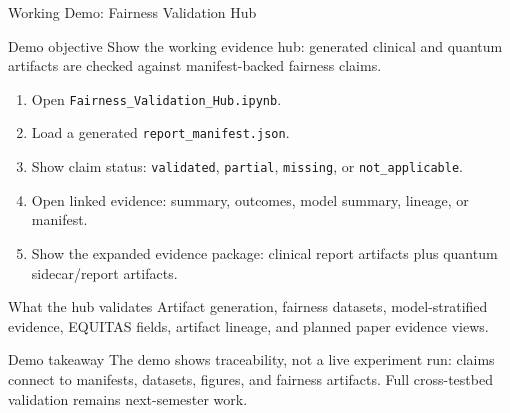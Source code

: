 \begin{frame}{Working Demo: Fairness Validation Hub}
\small

\begin{block}{Demo objective}
Show the working evidence hub: generated clinical and quantum artifacts are checked against manifest-backed fairness claims.
\end{block}

\vspace{0.2em}

\begin{enumerate}
    \item Open \texttt{Fairness\_Validation\_Hub.ipynb}.
    \item Load a generated \texttt{report\_manifest.json}.
    \item Show claim status: \texttt{validated}, \texttt{partial}, \texttt{missing}, or \texttt{not\_applicable}.
    \item Open linked evidence: summary, outcomes, model summary, lineage, or manifest.
    \item Show the expanded evidence package: clinical report artifacts plus quantum sidecar/report artifacts.
\end{enumerate}

\vspace{0.2em}

\begin{block}{What the hub validates}
Artifact generation, fairness datasets, model-stratified evidence, EQUITAS fields, artifact lineage, and planned paper evidence views.
\end{block}

\vspace{0.1em}

\begin{block}{Demo takeaway}
The demo shows traceability, not a live experiment run: claims connect to manifests, datasets, figures, and fairness artifacts. Full cross-testbed validation remains next-semester work.
\end{block}

\end{frame}

